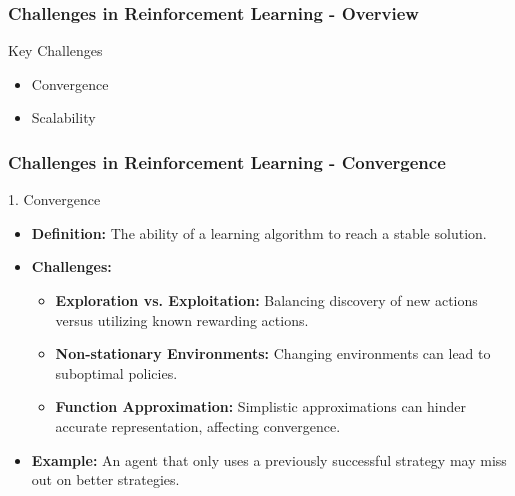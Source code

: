 \documentclass[aspectratio=169]{beamer}
\begin{document}
\begin{frame}[fragile]
    \frametitle{Challenges in Reinforcement Learning - Overview}
    \begin{block}{Key Challenges}
        \begin{itemize}
            \item Convergence
            \item Scalability
        \end{itemize}
    \end{block}
\end{frame}

\begin{frame}[fragile]
    \frametitle{Challenges in Reinforcement Learning - Convergence}
    \begin{block}{1. Convergence}
        \begin{itemize}
            \item \textbf{Definition:} The ability of a learning algorithm to reach a stable solution.
            \item \textbf{Challenges:}
            \begin{itemize}
                \item \textbf{Exploration vs. Exploitation:} Balancing discovery of new actions versus utilizing known rewarding actions.
                \item \textbf{Non-stationary Environments:} Changing environments can lead to suboptimal policies.
                \item \textbf{Function Approximation:} Simplistic approximations can hinder accurate representation, affecting convergence.
            \end{itemize}
            \item \textbf{Example:} An agent that only uses a previously successful strategy may miss out on better strategies.
        \end{itemize}
    \end{block}
\end{frame}
\end{document}
